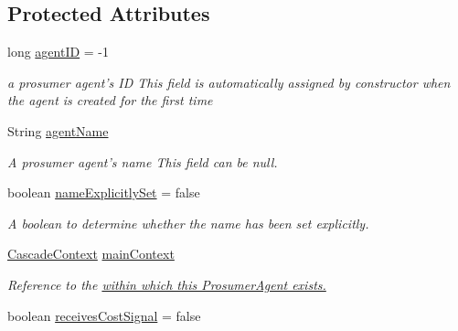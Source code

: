 \subsection*{Protected Attributes}
\begin{DoxyCompactItemize}
\item 
\hypertarget{classuk_1_1ac_1_1dmu_1_1iesd_1_1cascade_1_1agents_1_1prosumers_1_1_prosumer_agent_a548bbfbae2a8f4a0e869c4f9caf2d443}{long \hyperlink{classuk_1_1ac_1_1dmu_1_1iesd_1_1cascade_1_1agents_1_1prosumers_1_1_prosumer_agent_a548bbfbae2a8f4a0e869c4f9caf2d443}{agent\-I\-D} = -\/1}\label{classuk_1_1ac_1_1dmu_1_1iesd_1_1cascade_1_1agents_1_1prosumers_1_1_prosumer_agent_a548bbfbae2a8f4a0e869c4f9caf2d443}

\begin{DoxyCompactList}\small\item\em a prosumer agent's I\-D This field is automatically assigned by constructor when the agent is created for the first time \end{DoxyCompactList}\item 
\hypertarget{classuk_1_1ac_1_1dmu_1_1iesd_1_1cascade_1_1agents_1_1prosumers_1_1_prosumer_agent_a390465d4fb22f493d1c85b48214ca168}{String \hyperlink{classuk_1_1ac_1_1dmu_1_1iesd_1_1cascade_1_1agents_1_1prosumers_1_1_prosumer_agent_a390465d4fb22f493d1c85b48214ca168}{agent\-Name}}\label{classuk_1_1ac_1_1dmu_1_1iesd_1_1cascade_1_1agents_1_1prosumers_1_1_prosumer_agent_a390465d4fb22f493d1c85b48214ca168}

\begin{DoxyCompactList}\small\item\em A prosumer agent's name This field can be {\ttfamily null}. \end{DoxyCompactList}\item 
boolean \hyperlink{classuk_1_1ac_1_1dmu_1_1iesd_1_1cascade_1_1agents_1_1prosumers_1_1_prosumer_agent_ab01e8cf16e8d2b4c12e5cca9efd840c1}{name\-Explicitly\-Set} = false
\begin{DoxyCompactList}\small\item\em A boolean to determine whether the name has been set explicitly. \end{DoxyCompactList}\item 
\hyperlink{classuk_1_1ac_1_1dmu_1_1iesd_1_1cascade_1_1context_1_1_cascade_context}{Cascade\-Context} \hyperlink{classuk_1_1ac_1_1dmu_1_1iesd_1_1cascade_1_1agents_1_1prosumers_1_1_prosumer_agent_a237dcff035ef786226e3843e8021761a}{main\-Context}
\begin{DoxyCompactList}\small\item\em Reference to the \hyperlink{}{within which this Prosumer\-Agent exists. }\end{DoxyCompactList}\item 
\hypertarget{classuk_1_1ac_1_1dmu_1_1iesd_1_1cascade_1_1agents_1_1prosumers_1_1_prosumer_agent_a8521d1ba426c849386b0064c9adc7b43}{boolean \hyperlink{classuk_1_1ac_1_1dmu_1_1iesd_1_1cascade_1_1agents_1_1prosumers_1_1_prosumer_agent_a8521d1ba426c849386b0064c9adc7b43}{receives\-Cost\-Signal} = false}\label{classuk_1_1ac_1_1dmu_1_1iesd_1_1cascade_1_1agents_1_1prosumers_1_1_prosumer_agent_a8521d1ba426c849386b0064c9adc7b43}


\end{DoxyCompactItemize}
